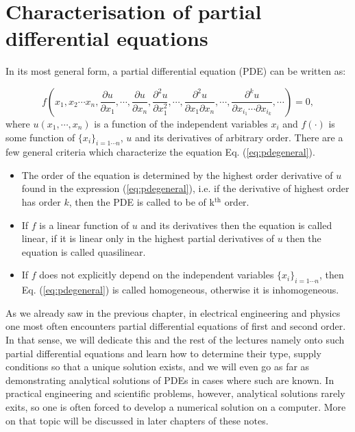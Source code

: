 \chapter{Characterisation of partial differential equations}

In its most general form, a partial differential equation (PDE) can be written as:


\begin{equation}
  \label{eq:pdegeneral}
  f(x_1,x_2\cdots x_n, \frac{\partial u}{\partial x_1},\cdots, \frac{\partial u}{\partial x_n}, \frac{\partial^2 u}{\partial x_1^2 },\cdots,\frac{\partial^2 u}{\partial x_1 \partial x_n},\cdots, \frac{\partial^k u}{\partial x_{i_1} \cdots \partial x_{i_k} }, \cdots) = 0,
\end{equation}
where $u(x_1,\cdots,x_n)$ is a function of the independent variables $x_i$ and $f(\cdot)$ is some function of  $\{x_i\}_{i=1\cdots n}$, $u$ and its derivatives of arbitrary order. There are a few general criteria which characterize the equation 
Eq. (\ref{eq:pdegeneral}).

\begin{itemize}
  \item The order of the equation is determined by the highest order derivative of $u$ found in the expression (\ref{eq:pdegeneral}), i.e. if the derivative of highest order has order $k$, then the PDE is called to be of k$^\text{th}$ order. 
  \item If $f$ is a linear function of $u$ and its derivatives then the equation is called linear, if it is linear only in the highest partial derivatives of $u$ then the equation is called quasilinear.
  \item If $f$ does not explicitly depend on the independent variables $\{x_i\}_{i=1\cdots n}$, then Eq. (\ref{eq:pdegeneral}) is called homogeneous, otherwise it is inhomogeneous. 
\end{itemize}

As we already saw in the previous chapter, in electrical engineering and physics one most often encounters partial differential equations of first and second order. In that sense, we will dedicate this and the rest of the lectures namely onto such partial differential equations and learn how to determine their type, supply conditions so that a unique solution exists, and we will even go as far as demonstrating analytical solutions of PDEs in cases where such are known. In practical engineering and scientific problems, however, analytical solutions rarely exits, so one is often forced to develop a numerical solution on a computer. More on that topic will be discussed in later chapters of these notes. 

